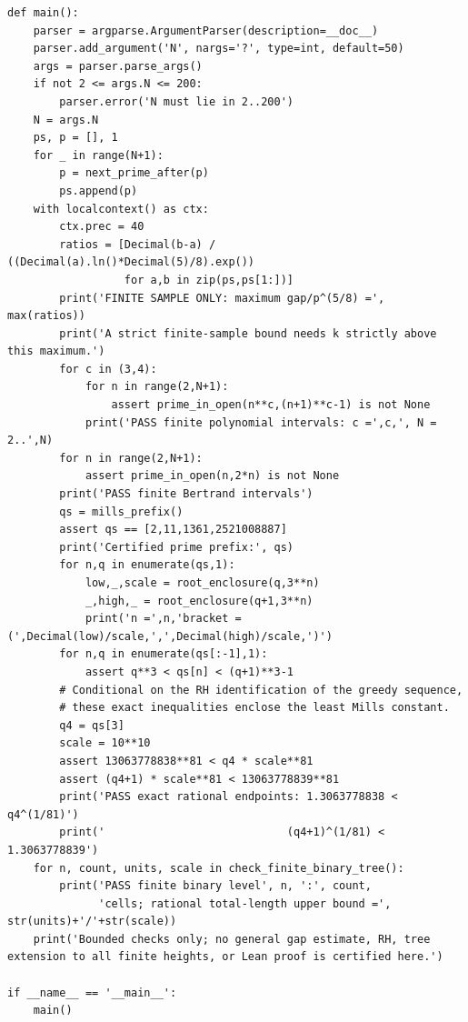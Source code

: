 \documentclass[11pt,reqno]{amsart}
\theoremstyle{blueplain}
\newcounter{type}
\newcounter{asser}
\numberwithin{equation}{section}
\begin{document}
\begin{lstlisting}[style=python,basicstyle=\ttfamily\scriptsize,numberstyle=\scriptsize]
def main():
    parser = argparse.ArgumentParser(description=__doc__)
    parser.add_argument('N', nargs='?', type=int, default=50)
    args = parser.parse_args()
    if not 2 <= args.N <= 200:
        parser.error('N must lie in 2..200')
    N = args.N
    ps, p = [], 1
    for _ in range(N+1):
        p = next_prime_after(p)
        ps.append(p)
    with localcontext() as ctx:
        ctx.prec = 40
        ratios = [Decimal(b-a) / ((Decimal(a).ln()*Decimal(5)/8).exp())
                  for a,b in zip(ps,ps[1:])]
        print('FINITE SAMPLE ONLY: maximum gap/p^(5/8) =', max(ratios))
        print('A strict finite-sample bound needs k strictly above this maximum.')
        for c in (3,4):
            for n in range(2,N+1):
                assert prime_in_open(n**c,(n+1)**c-1) is not None
            print('PASS finite polynomial intervals: c =',c,', N = 2..',N)
        for n in range(2,N+1):
            assert prime_in_open(n,2*n) is not None
        print('PASS finite Bertrand intervals')
        qs = mills_prefix()
        assert qs == [2,11,1361,2521008887]
        print('Certified prime prefix:', qs)
        for n,q in enumerate(qs,1):
            low,_,scale = root_enclosure(q,3**n)
            _,high,_ = root_enclosure(q+1,3**n)
            print('n =',n,'bracket = (',Decimal(low)/scale,',',Decimal(high)/scale,')')
        for n,q in enumerate(qs[:-1],1):
            assert q**3 < qs[n] < (q+1)**3-1
        # Conditional on the RH identification of the greedy sequence,
        # these exact inequalities enclose the least Mills constant.
        q4 = qs[3]
        scale = 10**10
        assert 13063778838**81 < q4 * scale**81
        assert (q4+1) * scale**81 < 13063778839**81
        print('PASS exact rational endpoints: 1.3063778838 < q4^(1/81)')
        print('                            (q4+1)^(1/81) < 1.3063778839')
    for n, count, units, scale in check_finite_binary_tree():
        print('PASS finite binary level', n, ':', count,
              'cells; rational total-length upper bound =', str(units)+'/'+str(scale))
    print('Bounded checks only; no general gap estimate, RH, tree extension to all finite heights, or Lean proof is certified here.')

if __name__ == '__main__':
    main()
\end{lstlisting}
\end{document}
